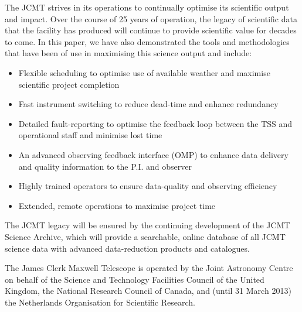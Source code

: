 \documentclass[]{spie}  %
\begin{document}
The JCMT strives in its operations to continually optimise its
scientific output and impact. Over the course of 25 years of
operation, the legacy of scientific data that the facility has
produced will continue to provide scientific value for decades to
come. In this paper, we have also demonstrated the tools and
methodologies that have been of use in maximising this science output
and include:
\begin{itemize}
\item Flexible scheduling to optimise use of available weather and
  maximise scientific project completion
\item Fast instrument switching to reduce dead-time and enhance
  redundancy
\item Detailed fault-reporting to optimise the feedback loop between
  the TSS and operational staff and minimise lost time
\item An advanced observing feedback interface (OMP) to enhance data
  delivery and quality information to the P.I. and observer
\item Highly trained operators to ensure data-quality and observing
  efficiency
\item Extended, remote operations to maximise project time
\end{itemize}

The JCMT legacy will be ensured by the continuing development of the
JCMT Science Archive,\cite{jsahistory} which will provide a searchable,
online database of all JCMT science data with advanced data-reduction
products and catalogues.\cite{2014SPIE9152-93}

\acknowledgments     %

The James Clerk Maxwell Telescope is operated by the Joint Astronomy
Centre on behalf of the Science and Technology Facilities Council of
the United Kingdom, the National Research Council of Canada, and
(until 31 March 2013) the Netherlands Organisation for Scientific
Research.



\end{document}
